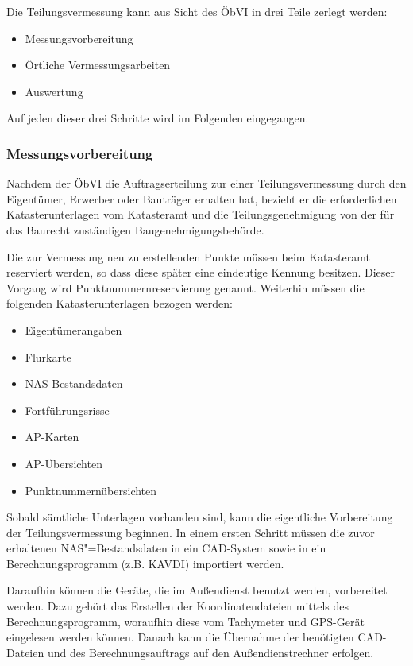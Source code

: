 Die Teilungsvermessung kann aus Sicht des \ac{ÖbVI} in drei Teile zerlegt werden:
\begin{itemize}
	\item Messungsvorbereitung
	\item Örtliche Vermessungsarbeiten
	\item Auswertung
\end{itemize}

Auf jeden dieser drei Schritte wird im Folgenden eingegangen.

\subsubsection{Messungsvorbereitung}

Nachdem der \ac{ÖbVI} die Auftragserteilung zur einer Teilungsvermessung durch den Eigentümer, Erwerber oder Bauträger erhalten hat, bezieht er die erforderlichen Katasterunterlagen vom Katasteramt und die Teilungsgenehmigung von der für das Baurecht zuständigen Baugenehmigungsbehörde.

Die zur Vermessung neu zu erstellenden Punkte müssen beim Katasteramt reserviert werden, so dass diese später eine eindeutige Kennung besitzen. Dieser Vorgang wird Punktnummernreservierung genannt. Weiterhin müssen die folgenden Katasterunterlagen bezogen werden:
\begin{itemize}
	\item Eigentümerangaben
	\item Flurkarte
	\item NAS-Bestandsdaten
	\item Fortführungsrisse
	\item AP-Karten
	\item AP-Übersichten
	\item Punktnummernübersichten
\end{itemize}
Sobald sämtliche Unterlagen vorhanden sind, kann die eigentliche Vorbereitung der Teilungsvermessung beginnen. In einem ersten Schritt müssen die zuvor erhaltenen NAS"=Bestandsdaten in ein CAD-System sowie in ein Berechnungsprogramm (z.B. KAVDI) importiert werden.

Daraufhin können die Geräte, die im Außendienst benutzt werden, vorbereitet werden.
Dazu gehört das Erstellen der Koordinatendateien mittels des Berechnungsprogramm, woraufhin diese vom Tachymeter und GPS-Gerät eingelesen werden können. Danach kann die Übernahme der benötigten CAD-Dateien und des Berechnungsauftrags auf den Außendienstrechner erfolgen.

